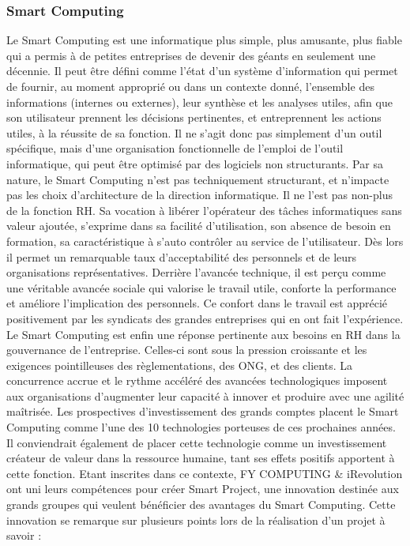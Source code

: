 \documentclass[a4paper,11pt,oneside]{report}
\begin{document}
\subsubsection*{Smart Computing}
Le Smart Computing est une informatique plus simple, plus amusante, plus fiable qui a permis à de petites entreprises de devenir des géants en seulement une décennie. Il peut être défini comme l'état d'un système d'information qui permet de fournir, au moment approprié ou dans un contexte donné, l'ensemble des informations (internes ou externes), leur synthèse et les analyses utiles, afin que son utilisateur prennent les décisions pertinentes, et entreprennent les actions utiles, à la réussite de sa fonction. Il ne s'agit donc pas simplement d'un outil spécifique, mais d'une organisation fonctionnelle de l'emploi de l'outil informatique, qui peut être optimisé par des logiciels non structurants.
\newline
\newline
Par sa nature, le Smart Computing n'est pas techniquement structurant, et n’impacte pas les choix d’architecture de la direction informatique. Il ne l'est pas non-plus de la fonction RH. Sa vocation à libérer l'opérateur des tâches informatiques sans valeur ajoutée, s'exprime dans sa facilité d'utilisation, son absence de besoin en formation, sa caractéristique à s'auto contrôler au service de l'utilisateur.
\newline
\newline
Dès lors il permet un remarquable taux d'acceptabilité des personnels et de leurs organisations représentatives. Derrière l'avancée technique, il est perçu comme une véritable avancée sociale qui valorise le travail utile, conforte la performance et améliore l'implication des personnels. Ce confort dans le travail est apprécié positivement par les syndicats des grandes entreprises qui en ont fait l'expérience.
\newline
\newline
Le Smart Computing est enfin une réponse pertinente aux besoins en RH dans la gouvernance de l'entreprise. Celles-ci sont sous la pression croissante et les exigences pointilleuses des règlementations, des ONG, et des clients. La concurrence accrue et le rythme accéléré des avancées technologiques imposent aux organisations d'augmenter leur capacité à innover et produire avec une agilité maîtrisée.
\newline
\newline
Les prospectives d'investissement des grands comptes placent le Smart Computing comme l'une des 10 technologies porteuses de ces prochaines années. Il conviendrait également de placer cette technologie comme un investissement créateur de valeur dans la ressource humaine, tant ses effets positifs apportent à cette fonction.
\newline
\newline
Etant inscrites dans ce contexte, FY COMPUTING \& iRevolution ont uni leurs compétences pour créer Smart Project, une innovation destinée aux grands groupes qui veulent bénéficier des avantages du Smart Computing. Cette innovation se remarque sur plusieurs points lors de la réalisation d’un projet à savoir :
\end{document}
